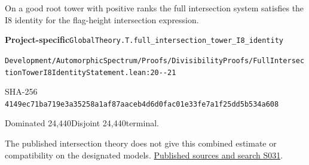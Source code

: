 
\begin{formalstatement}[D317]\label{decomp:D317}
On a good root tower with positive ranks the full intersection system satisfies the I8 identity for the flag-height intersection expression.
\end{formalstatement}
{\small\raggedright\noindent\textsf{\bfseries Project-specific}\quad \nolinkurl{GlobalTheory.T.full_intersection_tower_I8_identity}\par\noindent \nolinkurl{Development/AutomorphicSpectrum/Proofs/DivisibilityProofs/FullIntersectionTowerI8IdentityStatement.lean:20--21}\par\noindent SHA-256 \nolinkurl{4149ec71ba719e3a35258a1af87aaceb4d6d0fac01e33fe7a1f25dd5b534a608}\par\noindent Dominated 24,440\quad Disjoint 24,440\quad terminal.\par}
The published intersection theory does not give this combined estimate or compatibility on the designated models.
\hyperref[lit:S031]{Published sources and search S031}.
